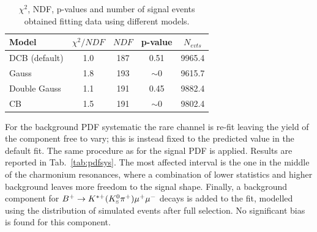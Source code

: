 \begin{center}
\begin{table}[h]
\centering
\caption{$\chi^2$, NDF, p-values and number of signal events obtained fitting \Lb\to\jpsi\Lz data using different models.}
\begin{tabular}{lcccc}
\hline
Model   		& $\chi^2/NDF$  & $NDF$  & p-value  & $N_{evts}$ \\ \hline
DCB  (default)	&    1.0   &   187   &    0.51      & 9965.4  \\
Gauss			&    1.8   &   193   &    $\sim 0$  & 9615.7 \\
Double Gauss  	&    1.1   &   191   &    0.45      & 9882.4  \\
CB  			&    1.5   &   191   &    $\sim 0$  & 9802.4 \\
\hline
\end{tabular}
\label{PDFsys}
\end{table}
\end{center}

For the background PDF systematic the rare channel is re-fit leaving the yield of the \KS component free to vary;
this is instead fixed to the predicted value in the default fit. The same procedure as for the signal PDF is applied.
Results are reported in Tab.~\ref{tab:pdfsys}. The most affected \qsq interval is the one in the middle of the charmonium
resonances, where a combination of lower statistics and higher background leaves more freedom to the signal shape.
Finally, a background component for $B^{+} \ra K^{*+}(\KS\pi^+)\mumu$ decays is added to the fit, modelled using
the distribution of simulated events after full selection. No significant bias is found for this component.

